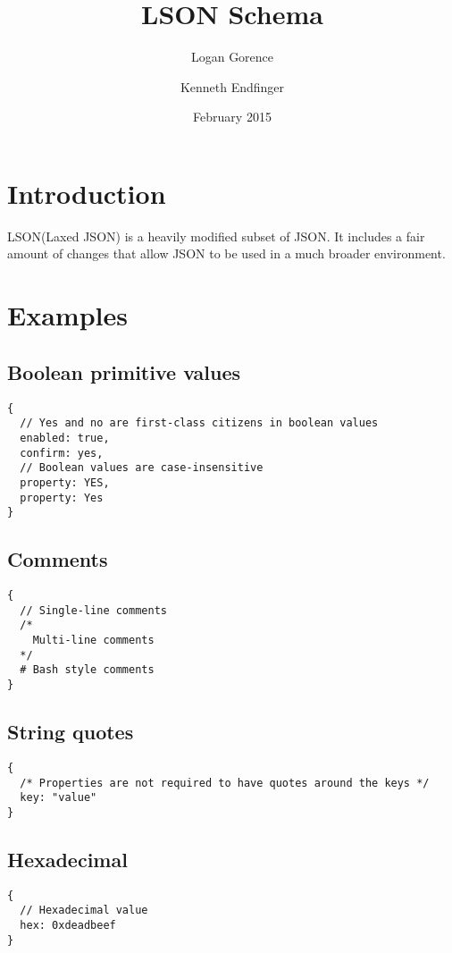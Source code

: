 \documentclass[12pt]{article}
\begin{document}
\title{LSON Schema}
\author{Logan Gorence \and Kenneth Endfinger}
\date{February 2015}
\maketitle
{}
\newpage

\tableofcontents

\newpage

\section{Introduction}
LSON(Laxed JSON) is a heavily modified subset of JSON. It includes a fair amount of changes that allow JSON to be used in a much  broader environment.

\newpage

\section{Examples}
\subsection{Boolean primitive values}
\label{booleanPrimValueExample}
\begin{lstlisting}
{
  // Yes and no are first-class citizens in boolean values
  enabled: true,
  confirm: yes,
  // Boolean values are case-insensitive
  property: YES,
  property: Yes
}
\end{lstlisting}

\subsection{Comments}
\label{commentsExample}
\begin{lstlisting}
{
  // Single-line comments
  /*
    Multi-line comments
  */
  # Bash style comments
}
\end{lstlisting}

\subsection{String quotes}
\label{stringQuotesExample}
\begin{lstlisting}
{
  /* Properties are not required to have quotes around the keys */
  key: "value"
}
\end{lstlisting}

\subsection{Hexadecimal}
\label{hexExample}
\begin{lstlisting}
{
  // Hexadecimal value
  hex: 0xdeadbeef
}
\end{lstlisting}
\end{document}
